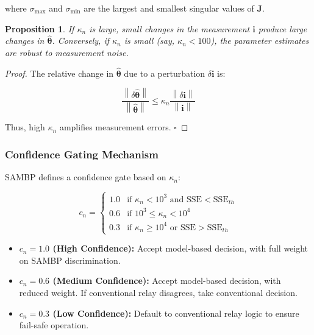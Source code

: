 \documentclass[12pt,a4paper]{article}
\newtheorem{proposition}[theorem]{Proposition}
\newcommand{\norm}[1]{\left\lVert#1\right\rVert}
\newcommand{\hattheta}{\hat{\boldsymbol{\theta}}}
\newcommand{\kappan}{\kappa_n}
\newcommand{\SSE}{\text{SSE}}
\begin{document}
where $\sigma_{\max}$ and $\sigma_{\min}$ are the largest and smallest singular values of $\mathbf{J}$.

\begin{proposition}
\label{prop:cond_sensitivity}
If $\kappan$ is large, small changes in the measurement $\mathbf{i}$ produce large changes 
in $\hattheta$. Conversely, if $\kappan$ is small (say, $\kappan < 100$), the parameter 
estimates are robust to measurement noise.
\end{proposition}

\begin{proof}
The relative change in $\hattheta$ due to a perturbation $\delta \mathbf{i}$ is:

\begin{equation}
\frac{\norm{\delta \hattheta}}{\norm{\hattheta}} \leq \kappan \frac{\norm{\delta \mathbf{i}}}{\norm{\mathbf{i}}}
\label{eq:cond_bound}
\end{equation}

Thus, high $\kappan$ amplifies measurement errors. \hfill $\square$
\end{proof}

\subsubsection{Confidence Gating Mechanism}

SAMBP defines a confidence gate based on $\kappan$:

\begin{equation}
c_n = \begin{cases}
1.0 & \text{if } \kappan < 10^3 \text{ and } \SSE < \text{SSE}_{th} \\
0.6 & \text{if } 10^3 \leq \kappan < 10^4 \\
0.3 & \text{if } \kappan \geq 10^4 \text{ or } \SSE > \text{SSE}_{th}
\end{cases}
\label{eq:confidence_gate}
\end{equation}

\begin{itemize}
    \item \textbf{$c_n = 1.0$ (High Confidence):} Accept model-based decision, with full 
    weight on SAMBP discrimination.
    
    \item \textbf{$c_n = 0.6$ (Medium Confidence):} Accept model-based decision, with reduced 
    weight. If conventional relay disagrees, take conventional decision.
    
    \item \textbf{$c_n = 0.3$ (Low Confidence):} Default to conventional relay logic to 
    ensure fail-safe operation.
\end{itemize}
\end{document}
